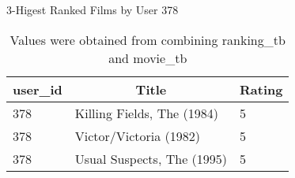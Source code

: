 \begin{table}[!htbp]
	\caption{3-Higest Ranked Films by User 378} \label{tab:higest-378}
	\begin{center}
	\vspace{-5mm}
		\begin{tabular}{ l l l }
			\hline
			\multicolumn{1}{c}{user\_id} & \multicolumn{1}{c}{Title} & \multicolumn{1}{c}{Rating}\\
			\hline
     		378 & Killing Fields, The (1984)  &      5\\
    		378 & Victor/Victoria (1982)      &      5\\
     		378 & Usual Suspects, The (1995)  &      5\\
			\hline
		\end{tabular}
	\caption*{\scriptsize Values were obtained from combining ranking\_tb and movie\_tb}
	 \end{center}
\end{table}